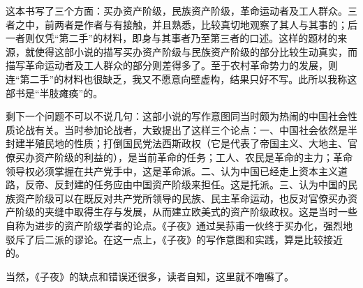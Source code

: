 \par 这本书写了三个方面：买办资产阶级，民族资产阶级，革命运动者及工人群众。三者之中，前两者是作者与有接触，并且熟悉，比较真切地观察了其人与其事的；后一者则仅凭“第二手”的材料，即身与其事者乃至第三者的口述。这样的题材的来源，就使得这部小说的描写买办资产阶级与民族资产阶级的部分比较生动真实，而描写革命运动者及工人群众的部分则差得多了。至于农村革命势力的发展，则连“第二手”的材料也很缺乏，我又不愿意向壁虚构，结果只好不写。此所以我称这部书是“半肢瘫痪”的。
\par 剩下一个问题不可以不说几句：这部小说的写作意图同当时颇为热闹的中国社会性质论战有关。当时参加论战者，大致提出了这样三个论点：一、中国社会依然是半封建半殖民地的性质；打倒国民党法西斯政权（它是代表了帝国主义、大地主、官僚买办资产阶级的利益的），是当前革命的任务；工人、农民是革命的主力；革命领导权必须掌握在共产党手中，这是革命派。二、认为中国已经走上资本主义道路，反帝、反封建的任务应由中国资产阶级来担任。这是托派。三、认为中国的民族资产阶级可以在既反对共产党所领导的民族、民主革命运动，也反对官僚买办资产阶级的夹缝中取得生存与发展，从而建立欧美式的资产阶级政权。这是当时一些自称为进步的资产阶级学者的论点。《子夜》通过吴荪甫一伙终于买办化，强烈地驳斥了后二派的谬论。在这一点上，《子夜》的写作意图和实践，算是比较接近的。
\par 当然，《子夜》的缺点和错误还很多，读者自知，这里就不噜囌了。
\par {}



